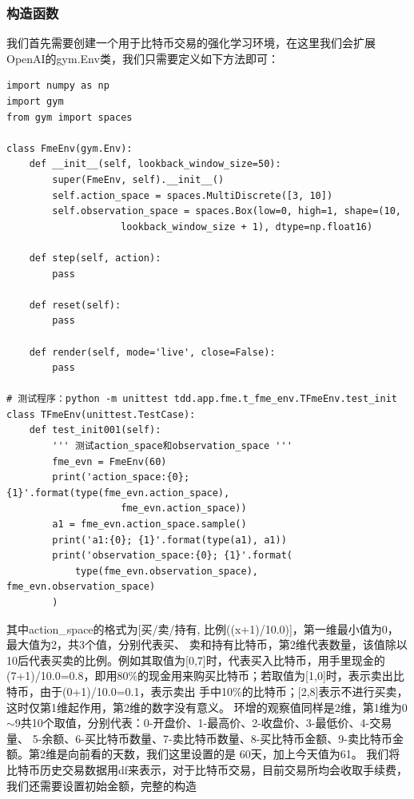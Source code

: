 \documentclass{article}
\begin{document}
\subsubsection{构造函数}
我们首先需要创建一个用于比特币交易的强化学习环境，在这里我们会扩展OpenAI的gym.Env类，我们只需要定义如下方法即可：
\begin{lstlisting}
import numpy as np
import gym
from gym import spaces

class FmeEnv(gym.Env):
    def __init__(self, lookback_window_size=50):
        super(FmeEnv, self).__init__()
        self.action_space = spaces.MultiDiscrete([3, 10])
        self.observation_space = spaces.Box(low=0, high=1, shape=(10, 
                    lookback_window_size + 1), dtype=np.float16)

    def step(self, action):
        pass

    def reset(self):
        pass

    def render(self, mode='live', close=False):
        pass

# 测试程序：python -m unittest tdd.app.fme.t_fme_env.TFmeEnv.test_init
class TFmeEnv(unittest.TestCase):
    def test_init001(self):
        ''' 测试action_space和observation_space '''
        fme_evn = FmeEnv(60)
        print('action_space:{0}; {1}'.format(type(fme_evn.action_space), 
                    fme_evn.action_space))
        a1 = fme_evn.action_space.sample()
        print('a1:{0}; {1}'.format(type(a1), a1))
        print('observation_space:{0}; {1}'.format(
            type(fme_evn.observation_space), fme_evn.observation_space)
        )
\end{lstlisting} 
其中action\_space的格式为[买/卖/持有, 比例((x+1)/10.0)]，第一维最小值为0，最大值为2，共3个值，分别代表买、
卖和持有比特币，第2维代表数量，该值除以10后代表买卖的比例。例如其取值为[0,7]时，代表买入比特币，用手里现金的
(7+1)/10.0=0.8，即用80\%的现金用来购买比特币；若取值为[1,0]时，表示卖出比特币，由于(0+1)/10.0=0.1，表示卖出
手中10\%的比特币；[2,8]表示不进行买卖，这时仅第1维起作用，第2维的数字没有意义。\newline
环增的观察值同样是2维，第1维为0$\sim$9共10个取值，分别代表：0-开盘价、1-最高价、2-收盘价、3-最低价、4-交易量、
5-余额、6-买比特币数量、7-卖比特币数量、8-买比特币金额、9-卖比特币金额。第2维是向前看的天数，我们这里设置的是
60天，加上今天值为61。\newline
我们将比特币历史交易数据用df来表示，对于比特币交易，目前交易所均会收取手续费，我们还需要设置初始金额，完整的构造
\end{document}
